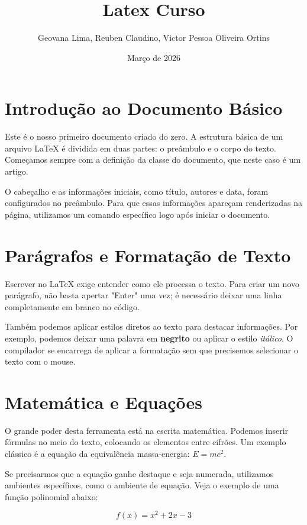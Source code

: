 \documentclass{article}
\title{Latex Curso}
\author{Geovana Lima, Reuben Claudino, Victor Pessoa Oliveira Ortins}
\date{Março de 2026}
\begin{document}
\maketitle

\section{Introdução ao Documento Básico}

Este é o nosso primeiro documento criado do zero. A estrutura básica de um arquivo \LaTeX{} é dividida em duas partes: o preâmbulo e o corpo do texto. Começamos sempre com a definição da classe do documento, que neste caso é um artigo. 

O cabeçalho e as informações iniciais, como título, autores e data, foram configurados no preâmbulo. Para que essas informações apareçam renderizadas na página, utilizamos um comando específico logo após iniciar o documento.

\section{Parágrafos e Formatação de Texto}

Escrever no \LaTeX{} exige entender como ele processa o texto. Para criar um novo parágrafo, não basta apertar "Enter" uma vez; é necessário deixar uma linha completamente em branco no código.

Também podemos aplicar estilos diretos ao texto para destacar informações. Por exemplo, podemos deixar uma palavra em \textbf{negrito} ou aplicar o estilo \textit{itálico}. O compilador se encarrega de aplicar a formatação sem que precisemos selecionar o texto com o mouse.

\section{Matemática e Equações}

O grande poder desta ferramenta está na escrita matemática. Podemos inserir fórmulas no meio do texto, colocando os elementos entre cifrões. Um exemplo clássico é a equação da equivalência massa-energia: $E = mc^2$.

Se precisarmos que a equação ganhe destaque e seja numerada, utilizamos ambientes específicos, como o ambiente de equação. Veja o exemplo de uma função polinomial abaixo:

\begin{equation}
f(x) = x^2 + 2x - 3
\end{equation}
\end{document}
